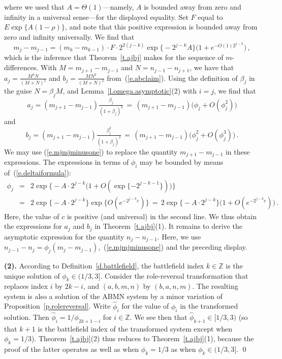 \documentclass[letterpaper,11pt,oneside,reqno]{amsbook}
\newcommand{\Z}{\ensuremath{\mathbb{Z}}}
\numberwithin{figure}{chapter}
\theoremstyle{definition}
\theoremstyle{definition}
\theoremstyle{definition}
\theoremstyle{definition}
\theoremstyle{definition}
\newcommand{\macbeta}{\beta}
\newcommand{\macphi}{\phi}
\newcommand{\abmnmacspace}{\textrm{ABMN} }
\begin{document}
where we used that $A = \Theta(1)$---namely, $A$ is bounded away from zero and infinity in a universal sense---for the displayed equality. Set $F$ equal to $E 
 \exp \big\{  A (   1 - \rho ) \big\}$, and note that this positive expression is bounded away from zero and infinity universally. We find that
\begin{equation}\label{e.mjmjminusone}
 m_j - m_{j-1} =  (m_k - m_{k-1})\cdot F \cdot  2^{2(j-k)} \exp \big\{ - 2^{j-k}A     \big\}   \big( 1 + e^{-O(1) 2^{j-k}}\big) \, ,
\end{equation}
which is the inference that Theorem~\ref{t.ajbj} makes for the sequence of $m$-differences.
With $M = m_{j+1} - m_{j-1}$ and $N = n_{j-1} - n_{j+1}$, we have that $a_j = \tfrac{M^2 N}{(M+N)^2}$
and $b_j = \tfrac{M N^2}{(M+N)^2}$ from~(\ref{e.abclaim}). Using the definition of $\beta_j$ in the guise $N = \macbeta_j M$, and Lemma~\ref{l.omega.asymptotic}(2) with $i=j$, we find that
$$
a_j =  ( m_{j+1} - m_{j-1}) \tfrac{\macbeta_j}{(1+\macbeta_j)^2} \, = \, ( m_{j+1} - m_{j-1})  \big(  \macphi_j + O(\macphi_j^2) \big)
$$
and
$$
 b_j =  ( m_{j+1} - m_{j-1}) \tfrac{\macbeta_j^2}{(1+\macbeta_j)^2} \, = \, ( m_{j+1} - m_{j-1})  \big(  \macphi_j^2 + O(\macphi_j^3) \big) \, .
$$
We may use (\ref{e.mjmjminusone}) to replace 
the quantity $m_{j+1} - m_{j-1}$ in these expressions. The expressions in terms of $\macphi_i$ may be bounded by means of~(\ref{e.deltaiformula}):
\begin{eqnarray*}
\macphi_j & = & 2 \exp \big\{ - A \cdot 2^{j-k} \big( 1 + O ( \exp \{ - 2^{j-k-1} \} ) \big) \big\} \\ 
& = &  2 \exp \big\{ - A \cdot 2^{j-k} \big\} \exp \big\{ O (e^{- 2^{j-k}c}) \big\} 
 \, = \, 2 \exp \big\{ - A \cdot 2^{j-k} \big\} \big( 1 + O (e^{- 2^{j-k}c}) \big) \, .
\end{eqnarray*}
Here, the value of $c$ is positive (and universal) in the second line.
We thus obtain the expressions for $a_j$ and $b_j$ in Theorem~\ref{t.ajbj}(1).
It remains to derive the asymptotic expression for the quantity $n_j - n_{j-1}$. Here, we use $n_{j-1} - n_j = \phi_j(m_j - m_{j-1})$,~(\ref{e.mjmjminusone}) and the preceding display. 

{\bf (2).} 
According to Definition~\ref{d.battlefield}, the battlefield index $k \in \Z$ is the unique solution of $\macphi_k \in (1/3,3]$.  Consider the role-reversal transformation that replaces index $i$ by $2k-i$, and $(a,b,m,n)$ by $(b,a,n,m)$. The resulting system is also a solution of the \abmnmacspace system by a minor variation of Proposition~\ref{p.rolereversal}. Write $\hat\phi_i$ for the value of $\phi_i$ in the transformed solution. Then $\hat\phi_i = 1/\phi_{2k+1 -i}$ for $i \in \Z$.
We see then that $\hat\phi_{k+1} \in [1/3,3)$ (so that $k+1$ is the battlefield index of the transformed system except when $\phi_k =1/3$). 
Theorem~\ref{t.ajbj}(2) thus reduces to Theorem~\ref{t.ajbj}(1), because the proof of the latter operates as well as when $\phi_k = 1/3$ as when $\macphi_k \in (1/3,3]$. \qed
\end{document}
